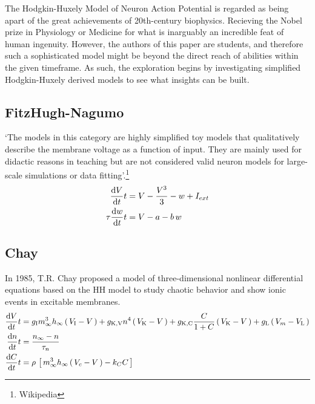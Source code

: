 \documentclass[../../Orator.tex]{subfiles}
\begin{document}
The Hodgkin-Huxely Model of Neuron Action Potential is regarded as being apart of the great achievements of 20th-century biophysics. Recieving the Nobel prize in Physiology or Medicine for what is inarguably an incredible feat of human ingenuity. However, the authors of this paper are students, and therefore such a sophisticated model might be beyond the direct reach of abilities within the given timeframe. 
As such, the exploration begins by investigating simplified Hodgkin-Huxely derived models to see what insights can be built.

\subsection{FitzHugh-Nagumo}
`The models in this category are highly simplified toy models that qualitatively describe the membrane voltage as a function of input. They are mainly used for didactic reasons in teaching but are not considered valid neuron models for large-scale simulations or data fitting'.\footnote{Wikipedia}
\begin{subequations}\label{eq:FitNagSys}
    \begin{align}
        \ode{V}{t} &= V - \frac{V^3}{3} - w + I_{ext} \\ 
        \tau\ode{w}{t} &= V - a - b\,w 
    \end{align}
\end{subequations}


\subsection{Chay}
In 1985, T.R. Chay proposed a model of three-dimensional nonlinear differential equations based on the HH model to study chaotic behavior and show ionic events in excitable membranes. 
\begin{subequations}\label{eq:ChaySys}
    \begin{align}
        \ode{V}{t} &= g_\rmm{I}  m^3_\infty h_\infty \br{V_\rmm{I} - V} + g_\rmm{K, V} n^4 \br{V_\rmm{K} - V} + g_\rmm{K, C}  \frac{C}{1+C}\br{V_\rmm{K} - V} + g_\rmm{L} \br{V_m - V_\rmm{L}} \\ 
        \ode{n}{t} &= \frac{n_\infty - n}{\tau_n} \\
        \ode{C}{t} &= \rho \, \sbr{m^3_\infty h_\infty \br{V_c - V} - k_C C}
    \end{align}
\end{subequations}
\end{document}
